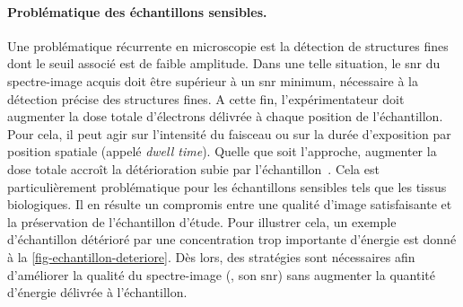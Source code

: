     \paragraph{Problématique des échantillons sensibles.} Une problématique récurrente en microscopie est la détection de structures fines dont le seuil associé est de faible amplitude. Dans une telle situation, le \gls{snr} du spectre-image acquis doit être supérieur à un \gls{snr} minimum, nécessaire à la détection précise des structures fines. A cette fin, l'expérimentateur doit augmenter la dose totale d'électrons délivrée à chaque position de l'échantillon. Pour cela, il peut agir sur l'intensité du faisceau ou sur la durée d'exposition par position spatiale (appelé \emph{dwell time}). Quelle que soit l'approche, augmenter la dose totale accroît la détérioration subie par l'échantillon~\cite{egerton2004radiation}. Cela est particulièrement problématique pour les échantillons sensibles tels que les tissus biologiques. 
    Il en résulte un compromis entre une qualité d'image satisfaisante et la préservation de l'échantillon d'étude. Pour illustrer cela, un exemple d'échantillon détérioré par une concentration trop importante d'énergie est donné à la \cref{fig-echantillon-deteriore}. Dès lors, des stratégies sont nécessaires afin d'améliorer la qualité du spectre-image (\ie{}, son \gls{snr}) sans augmenter la quantité d'énergie délivrée à l'échantillon.

